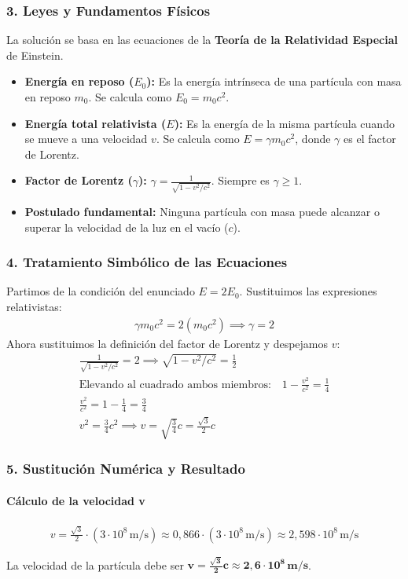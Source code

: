 \subsubsection*{3. Leyes y Fundamentos Físicos}
La solución se basa en las ecuaciones de la \textbf{Teoría de la Relatividad Especial} de Einstein.
\begin{itemize}
    \item \textbf{Energía en reposo ($E_0$):} Es la energía intrínseca de una partícula con masa en reposo $m_0$. Se calcula como $E_0 = m_0 c^2$.
    \item \textbf{Energía total relativista ($E$):} Es la energía de la misma partícula cuando se mueve a una velocidad $v$. Se calcula como $E = \gamma m_0 c^2$, donde $\gamma$ es el factor de Lorentz.
    \item \textbf{Factor de Lorentz ($\gamma$):} $\gamma = \frac{1}{\sqrt{1 - v^2/c^2}}$. Siempre es $\gamma \ge 1$.
    \item \textbf{Postulado fundamental:} Ninguna partícula con masa puede alcanzar o superar la velocidad de la luz en el vacío ($c$).
\end{itemize}

\subsubsection*{4. Tratamiento Simbólico de las Ecuaciones}
Partimos de la condición del enunciado $E = 2E_0$. Sustituimos las expresiones relativistas:
\begin{gather}
    \gamma m_0 c^2 = 2 (m_0 c^2) \implies \gamma = 2
\end{gather}
Ahora sustituimos la definición del factor de Lorentz y despejamos $v$:
\begin{gather}
    \frac{1}{\sqrt{1 - v^2/c^2}} = 2 \implies \sqrt{1 - v^2/c^2} = \frac{1}{2} \nonumber \\
    \text{Elevando al cuadrado ambos miembros:} \quad 1 - \frac{v^2}{c^2} = \frac{1}{4} \nonumber \\
    \frac{v^2}{c^2} = 1 - \frac{1}{4} = \frac{3}{4} \nonumber \\
    v^2 = \frac{3}{4}c^2 \implies v = \sqrt{\frac{3}{4}}c = \frac{\sqrt{3}}{2}c
\end{gather}

\subsubsection*{5. Sustitución Numérica y Resultado}
\paragraph*{Cálculo de la velocidad v}
\begin{gather}
    v = \frac{\sqrt{3}}{2} \cdot (3 \cdot 10^8\,\text{m/s}) \approx 0,866 \cdot (3 \cdot 10^8\,\text{m/s}) \approx 2,598 \cdot 10^8 \, \text{m/s}
\end{gather}
\begin{cajaresultado}
    La velocidad de la partícula debe ser $\boldsymbol{v = \frac{\sqrt{3}}{2}c \approx 2,6 \cdot 10^8 \, \textbf{m/s}}$.
\end{cajaresultado}
